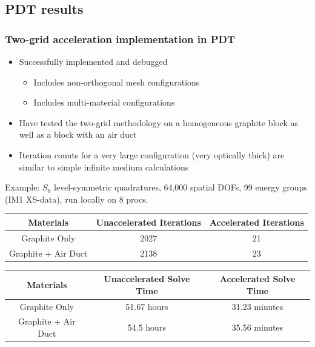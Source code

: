 \documentclass[compress,10pt]{beamer}
\begin{document}
\subsection{PDT results}
\begin{frame}[t]\frametitle{Two-grid acceleration implementation in PDT}
\begin{block}{}
\begin{itemize}
	\item Successfully implemented and debugged
	\begin{itemize}
		\item Includes non-orthogonal  mesh configurations
		\item Includes multi-material configurations
	\end{itemize}
	\item Have tested the two-grid methodology on a homogeneous graphite block as well as a block with an air duct
	\item Iteration counts for a very large configuration (very optically thick) are similar to simple infinite medium calculations
\end{itemize}
\end{block}
\centering

Example: $S_8$ level-symmetric quadratures, 64,000 spatial DOFs, 99 energy groups (IM1 XS-data), run locally on 8 procs.
\begin{table}
\footnotesize
\begin{tabular}{|c|c|c|}
\hline
Materials & Unaccelerated Iterations & Accelerated Iterations  \\
\hline \hline
Graphite Only & 2027 & 21 \\ \hline
Graphite + Air Duct & 2138 & 23 \\ \hline
\end{tabular}
\end{table}

\begin{table}
\footnotesize
\begin{tabular}{|c|c|c|}
\hline
Materials & Unaccelerated Solve Time  & Accelerated Solve Time  \\
\hline \hline
Graphite Only & 51.67 hours & 31.23 minutes \\ \hline
Graphite + Air Duct & 54.5 hours & 35.56 minutes \\ \hline
\end{tabular}
\end{table}


\end{frame}
\typeout{***********************************************************************************}
\end{document}
